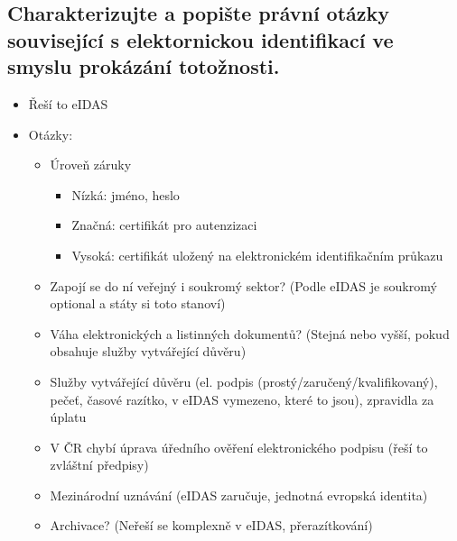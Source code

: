 \subsection{Charakterizujte a popište právní otázky související s elektornickou identifikací ve smyslu prokázání totožnosti.}
\begin{itemize}
    \item Řeší to eIDAS
    \item Otázky:
    \begin{itemize}
        \item Úroveň záruky
        \begin{itemize}
            \item Nízká: jméno, heslo
            \item Značná: certifikát pro autenzizaci
            \item Vysoká: certifikát uložený na elektronickém identifikačním průkazu
        \end{itemize}
        \item Zapojí se do ní veřejný i soukromý sektor? (Podle eIDAS je soukromý optional a státy si toto stanoví)
        \item Váha elektronických a listinných dokumentů? (Stejná nebo vyšší, pokud obsahuje služby vytvářející důvěru)
        \item Služby vytvářející důvěru (el. podpis (prostý/zaručený/kvalifikovaný), pečeť, časové razítko, v eIDAS vymezeno, které to jsou), zpravidla za úplatu
        \item V ČR chybí úprava úředního ověření elektronického podpisu (řeší to zvláštní předpisy)
        \item Mezinárodní uznávání (eIDAS zaručuje, jednotná evropská identita)
        \item Archivace? (Neřeší se komplexně v eIDAS, přerazítkování)
    \end{itemize}
\end{itemize}


